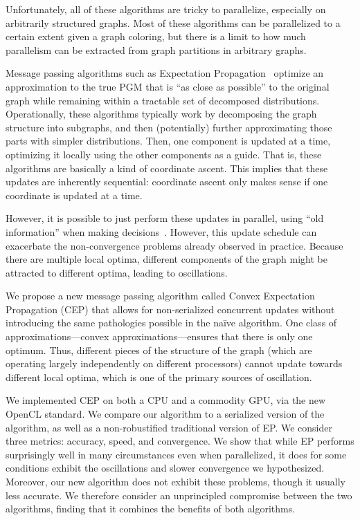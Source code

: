 \documentclass[times, 10pt,twocolumn]{article}
\begin{document}
Unfortunately, all of these algorithms are tricky to parallelize,
especially on arbitrarily structured graphs. Most of these algorithms
can be parallelized to a certain extent given a graph coloring, but
there is a limit to how much parallelism can be extracted from graph
partitions in arbitrary graphs.

Message passing algorithms such as Expectation
Propagation~\cite{Minka01} optimize an approximation to the true
PGM that is ``as close as possible'' to the original graph while
remaining within a tractable set of decomposed distributions.
Operationally, these algorithms typically work by decomposing the
graph structure into subgraphs, and then (potentially) further
approximating those parts with simpler distributions. Then, one
component is updated at a time, optimizing it locally using the
other components as a guide. That is, these algorithms are basically
a kind of coordinate ascent. This implies that these updates are
inherently sequential: coordinate ascent only makes sense if one
coordinate is updated at a time.

However, it is possible to just perform these updates in parallel,
using ``old information'' when making decisions~\cite{CsekeHeskes2010}.
However, this update schedule can exacerbate the non-convergence
problems already observed in practice. Because there are multiple
local optima, different components of the graph might be attracted
to different optima, leading to oscillations.

We propose a new message passing algorithm called Convex Expectation
Propagation (CEP) that allows for non-serialized concurrent updates
without introducing the same pathologies possible in the na\"ive
algorithm.  One class of approximations---convex approximations---ensures
that there is only one optimum.\cite{wainwright03trw} Thus, different
pieces of the structure of the graph (which are operating largely
independently on different processors) cannot update towards different
local optima, which is one of the primary sources of oscillation.

We implemented CEP on both a CPU and a commodity GPU, via the new
OpenCL standard. We compare our algorithm to a serialized version
of the algorithm, as well as a non-robustified traditional version
of EP. We consider three metrics: accuracy, speed, and convergence.
We show that while EP performs surprisingly well in many circumstances
even when parallelized, it does for some conditions exhibit the
oscillations and slower convergence we hypothesized. Moreover, our
new algorithm does not exhibit these problems, though it usually
less accurate. We therefore consider an unprincipled compromise
between the two algorithms, finding that it combines the benefits of
both algorithms.
\end{document}
